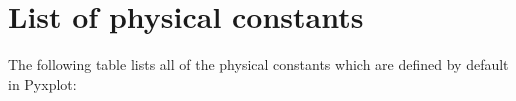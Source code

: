 %
%
%
%
%



\chapter{List of physical constants}
\label{ch:constants}

The following table lists all of the physical constants which are defined by default in Pyxplot:

